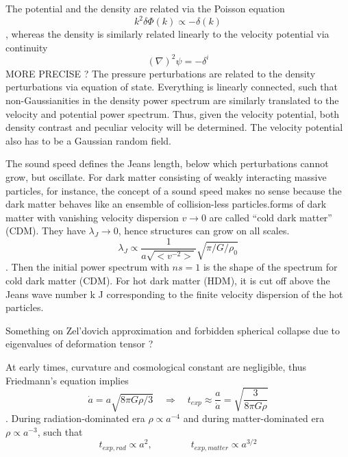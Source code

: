 \begin{description}
	\item[ How are the potential, velocity and density power spectrum related ?]
	The potential and the density are related via the Poisson equation
	\[
	k^2 \delta\Phi(k) \propto - \delta(k)\], whereas the density is similarly related linearly to the velocity potential via continuity
	\begin{equation}
		(\nabla)^2 \psi = - \delta^i
	\end{equation} MORE PRECISE ? The pressure perturbations are related to the density perturbations via equation of state.
	Everything is linearly connected, such that non-Gaussianities in the density power spectrum are similarly translated to the velocity and potential power spectrum.
	Thus, given
	the velocity potential, both density contrast and peculiar
	velocity will be determined. The velocity potential also
	has to be a Gaussian random field.
	\item[Jeans Length, dispersion less CDM] The sound speed defines the Jeans length, below which perturbations cannot grow, but oscillate. For dark matter consisting of
	weakly interacting massive particles, for instance, the concept of a
	sound speed makes no sense because the dark matter behaves like
	an ensemble of collision-less particles.forms of dark matter with vanishing velocity dispersion $v \rightarrow 0$ are called “cold
	dark matter” (CDM). They have $\lambda_J \rightarrow 0$, hence structures can
	grow on all scales.
	\[			\lambda_J \propto \frac{1}{a \sqrt{<v^{-2}>}} \sqrt{\pi/G/\rho_0 } \].
	Then the initial power spectrum with $ns=1$ is the shape of the spectrum for cold dark matter (CDM).
	For hot dark matter (HDM), it is cut off above the Jeans wave
	number k J corresponding to the finite velocity dispersion of the
	hot particles.
	\item Something on Zel'dovich approximation and forbidden spherical collapse due to eigenvalues of deformation tensor ?
	\item[Expansion and collision time scale]  At early times, curvature and cosmological constant are negligible,
	thus Friedmann’s equation implies
	\[\dot{a} = a \sqrt{8 \pi G \rho/3} \quad \Rightarrow \quad t_{exp} \approx \frac{a}{\dot{a}} = \sqrt{\frac{3}{8 \pi G \rho}}\].
	During radiation-dominated era $\rho \propto a^{-4}$ and during matter-dominated era $\rho \propto a^{-3}$, such that
	\[ t_{exp, rad} \propto a^{2}, \qquad \qquad t_{exp,matter} \propto a^{3/2}  \]


\end{description}
